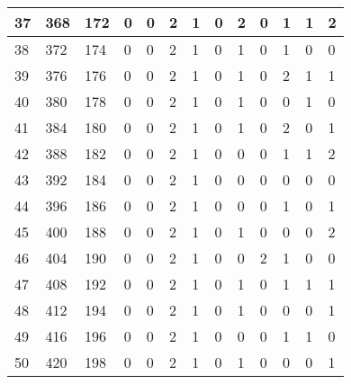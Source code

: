 \begin{sidewaystable}[!h]
\begin{tabular}{|l|l|l|l|l|l|l|l|l|l|l|l|l|}
		37 & 368 & 172 & 0 & 0 & 2 & 1 & 0 & 2 & 0 & 1 & 1 & 2 \\ \hline
		38 & 372 & 174 & 0 & 0 & 2 & 1 & 0 & 1 & 0 & 1 & 0 & 0 \\ \hline
		39 & 376 & 176 & 0 & 0 & 2 & 1 & 0 & 1 & 0 & 2 & 1 & 1 \\ \hline
		40 & 380 & 178 & 0 & 0 & 2 & 1 & 0 & 1 & 0 & 0 & 1 & 0 \\ \hline
		41 & 384 & 180 & 0 & 0 & 2 & 1 & 0 & 1 & 0 & 2 & 0 & 1 \\ \hline
		42 & 388 & 182 & 0 & 0 & 2 & 1 & 0 & 0 & 0 & 1 & 1 & 2 \\ \hline
		43 & 392 & 184 & 0 & 0 & 2 & 1 & 0 & 0 & 0 & 0 & 0 & 0 \\ \hline
		44 & 396 & 186 & 0 & 0 & 2 & 1 & 0 & 0 & 0 & 1 & 0 & 1 \\ \hline
		45 & 400 & 188 & 0 & 0 & 2 & 1 & 0 & 1 & 0 & 0 & 0 & 2 \\ \hline
		46 & 404 & 190 & 0 & 0 & 2 & 1 & 0 & 0 & 2 & 1 & 0 & 0 \\ \hline
		47 & 408 & 192 & 0 & 0 & 2 & 1 & 0 & 1 & 0 & 1 & 1 & 1 \\ \hline
		48 & 412 & 194 & 0 & 0 & 2 & 1 & 0 & 1 & 0 & 0 & 0 & 1 \\ \hline
		49 & 416 & 196 & 0 & 0 & 2 & 1 & 0 & 0 & 0 & 1 & 1 & 0 \\ \hline
		50 & 420 & 198 & 0 & 0 & 2 & 1 & 0 & 1 & 0 & 0 & 0 & 1 \\ \hline
	\end{tabular}
\end{sidewaystable}
\clearpage


